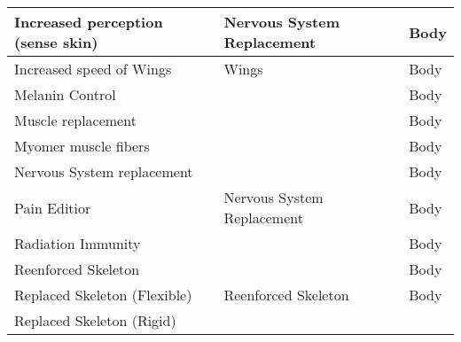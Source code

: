 \documentclass[twoside]{book}
\begin{document}
\begin{longtable}{p{1.25in}p{2em}ll}
  \raggedright
           Increased perception (sense
           skin) 
  &
  
  &
   Nervous System
           Replacement 
  &
   Body 
  \tabularnewline
  \hline
      
  \raggedright
           Increased speed of Wings
           
  &
  
  &
   Wings 
  &
   Body 
  \tabularnewline
  \hline
      
  \raggedright
           Melanin Control 
  &
  
  &
  
  &
   Body 
  \tabularnewline
  \hline
      
  \raggedright
           Muscle replacement 
  &
  
  &
  
  &
   Body 
  \tabularnewline
  \hline
      
  \raggedright
           Myomer muscle fibers 
  &
  
  &
  
  &
   Body 
  \tabularnewline
  \hline
      
  \raggedright
           Nervous System replacement
           
  &
  
  &
  
  &
   Body 
  \tabularnewline
  \hline
      
  \raggedright
           Pain Editior 
  &
  
  &
   Nervous System
           Replacement 
  &
   Body 
  \tabularnewline
  \hline
      
  \raggedright
           Radiation Immunity 
  &
  
  &
  
  &
   Body 
  \tabularnewline
  \hline
      
  \raggedright
           Reenforced Skeleton 
  &
  
  &
  
  &
   Body 
  \tabularnewline
  \hline
      
  \raggedright
           Replaced Skeleton (Flexible)
           
  &
  
  &
   Reenforced Skeleton
           
  &
   Body 
  \tabularnewline
  \hline
      
  \raggedright
           Replaced Skeleton (Rigid)
           
  &
  

\end{longtable}
\end{document}
